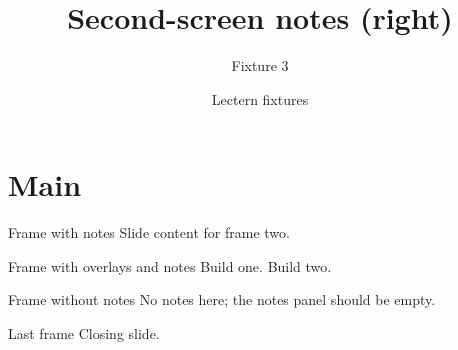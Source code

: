 \documentclass[aspectratio=169]{beamer}
\title{Second-screen notes (right)}
\subtitle{Fixture 3}
\author{Lectern fixtures}
\date{}
\begin{document}
\begin{frame}
  \titlepage
\end{frame}
\section{Main}
\begin{frame}{Frame with notes}
  Slide content for frame two.
\end{frame}
\begin{frame}{Frame with overlays and notes}
  Build one.
  \pause
  Build two.
\end{frame}
\begin{frame}{Frame without notes}
  No notes here; the notes panel should be empty.
\end{frame}
\begin{frame}{Last frame}
  Closing slide.
\end{frame}
\end{document}
